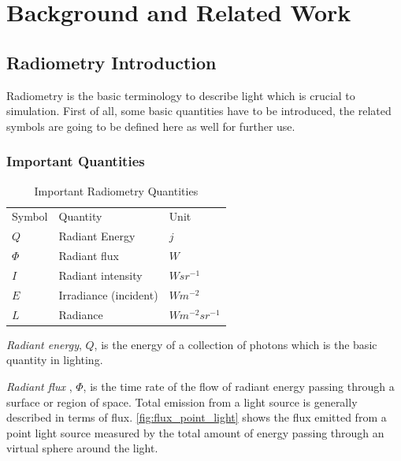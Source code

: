 \chapter{Background and Related Work}


\section{Radiometry Introduction}
Radiometry is the basic terminology to describe light which is crucial to simulation. First of all, some basic quantities have to be introduced, the related symbols are going to be defined here as well for further use.

\subsection{Important Quantities} 

\begin{table}[ht]
\begin{center}
	
	\renewcommand{\arraystretch}{1.2}
	\begin{tabular}{ | l | l | l |}     	
	\hline 

	Symbol & Quantity & Unit \\
	\cline{1-3}

	\(Q\) 			& 		Radiant Energy 				& 		\(j\) \\ 
	\(\Phi\) 			& 		Radiant flux 					& 		\(W\) \\ 
	\(I\) 			& 		Radiant intensity 				& 		\(W sr^{-1}\) \\
	\(E\)			&		Irradiance (incident) 			&		\(W m^{-2}\) \\  
	\(L\)			&		Radiance						&		\(W m^{-2} sr^{-1}\) \\ 
	
	\hline

	\end{tabular}
\end{center} 
\caption{Important Radiometry Quantities}
\label{tab:radiometry_quantities}
\end{table}

\emph{Radiant energy}, \(Q\), is the energy of a collection of photons which is the basic quantity in lighting. 

\emph{Radiant flux} , \(\Phi\), is the time rate of the flow of radiant energy passing through a surface or region of space. Total emission from a light source is generally described in terms of flux. \ref{fig:flux_point_light} shows the flux emitted from a point light source measured by the total amount of energy passing through an virtual sphere around the light. 

